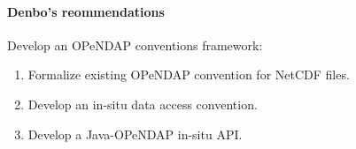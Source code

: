 \paragraph{Denbo's reommendations}

Develop an OPeNDAP conventions framework:

\begin{enumerate}
   \item  Formalize existing OPeNDAP convention for NetCDF files.
   \item  Develop an in-situ data access convention.
   \item  Develop a Java-OPeNDAP in-situ API.
\end{enumerate}

%
%
%
%

